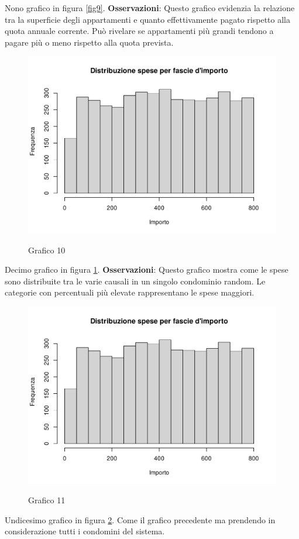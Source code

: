 Nono grafico in figura \ref{fig9}. \textbf{Osservazioni}: Questo grafico evidenzia la relazione tra la superficie degli appartamenti e quanto effettivamente pagato rispetto alla quota annuale corrente. Può rivelare se appartamenti più grandi tendono a pagare più o meno rispetto alla quota prevista.

\clearpage

\begin{figure}[t]
	\caption{Grafico 10}
	\includegraphics[page=10,width=\textwidth]{../R/grafici.pdf}
	\label{fig10}
\end{figure}

Decimo grafico in figura \ref{fig10}. \textbf{Osservazioni}: Questo grafico mostra come le spese sono distribuite tra le varie causali in un singolo condominio random. Le categorie con percentuali più elevate rappresentano le spese maggiori.

\clearpage

\begin{figure}[t]
	\caption{Grafico 11}
	\includegraphics[page=11,width=\textwidth]{../R/grafici.pdf}
	\label{fig11}
\end{figure}

Undicesimo grafico in figura \ref{fig11}. Come il grafico precedente ma prendendo in considerazione tutti i condomini del sistema.
